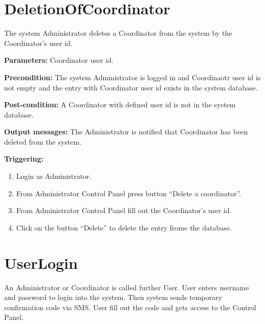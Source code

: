 \section{DeletionOfCoordinator}
\label{operation:DeletionOfCoordinator}
The system Administrator deletes a Coordinator from the system by the Coordinator's user id.

\begin{description}

\item \textbf{Parameters:} Coordinator user id.
\item \textbf{Precondition:} The system Administrator is logged in and
Coordinaotr user id is not empty and the entry with Coordinator user id exists
in the system database.
\item \textbf{Post-condition:} A Coordinator with defined user id is not in the
system database.
\item \textbf{Output messages:} The Administrator is notified that Coordinator
has been deleted from the system.

\item \textbf{Triggering:}
\begin{enumerate}
\item Login as Administrator.
\item From Administrator Control Panel press button ``Delete a coordinator''.
\item From Administrator Control Panel fill out the Coordinator's user id.
\item Click on the button ``Delete'' to delete the entry frome the database.
\end{enumerate}
 
\end{description}


\section{UserLogin}
\label{operation:UserLogin}
An Administrator or Coordinator is called further User. User enters username and
password to login into the system. Then system sends temporary confirmation code
via SMS. User fill out the code and gets access to the Control Panel.

